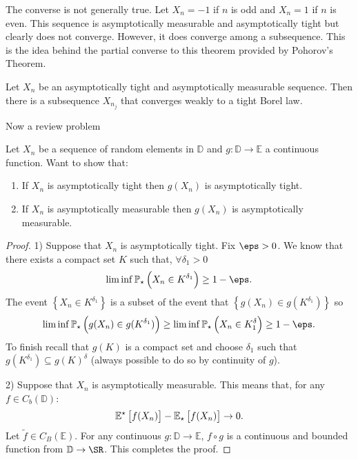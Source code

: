 The converse is not generally true. Let \(X_n = -1\) if  \(n\) is odd and \(X_n = 1\) if  \(n\) is even. This sequence is asymptotically measurable and asymptotically tight but clearly does not converge.  However, it does converge among a subsequence. This is the idea behind the partial converse to this theorem provided by Pohorov's Theorem.
\begin{theorem}
	\label{thm:pohorev}
	Let \(X_n\) be an asymptotically tight and asymptotically measurable sequence. Then there is a subsequence  \(X_{n_j}\) that converges weakly to a tight Borel law.
\end{theorem}
Now a review problem
\begin{example}
	\label{ex:p7}
	Let \(X_n\) be a sequence of random elements in  \(\mathbb{D}\) and \(g:\mathbb{D}\to\mathbb{E}\) a continuous function. Want to show that:
	 \begin{enumerate}
		 \item If \(X_n\) is asymptotically tight then  \(g(X_n)\) is asymptotically tight.
		 \item If \(X_n\) is asymptotically measurable then  \(g(X_n)\) is asymptotically measurable. 
	\end{enumerate}
\end{example}
\begin{proof}
	1) Suppose that \(X_n\) is asymptotically tight. Fix  \(\eps > 0\). We know that there exists a compact set  \(K\) such that, \(\forall \delta_1 > 0\)
	 \[
		 \lim\inf \P_\star\left(X_n \in K^{\delta_1}\right) \geq  1-\eps
	.\]
	The event \(\left\{X_n \in K^{\delta_1}\right\}\) is a subset of the event that \(\left\{g(X_n) \in g(K^{\delta_1})\right\}\) so
	\[
		\lim\inf \P_\star\left(g(X_n) \in g(K^{\delta_1})\right) \geq \lim\inf \P_\star\left(X_n \in K^\delta_1\right) \geq 1-\eps 
	.\] 
	To finish recall that \(g(K)\) is a compact set and choose \(\delta_1\) such that  \(g(K^{\delta_1})\subseteq g(K)^\delta\) (always possible to do so by continuity of  \(g\)).

	2) Suppose that \(X_n\) is asymptotically measurable. This means that, for any  \(f \in C_b(\mathbb{D})\):
	 \[
		 \mathbb{E}^\star\left[f(X_n)\right] - \mathbb{E}_\star\left[f(X_n)\right]\to0
	.\]
	Let \(\tilde f \in C_B(\mathbb{E})\). For any continuous \(g:\mathbb{D}\to \mathbb{E}\), \(f\circ g\) is a continuous and bounded function from  \(\mathbb{D}\to\SR\). This completes the proof.
\end{proof}

